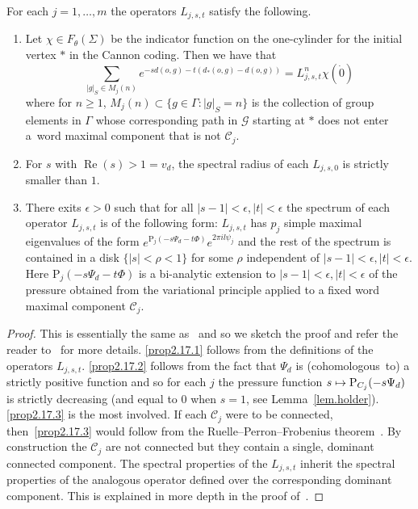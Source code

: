 \documentclass[AHL,Unicode,longabstracts,published]{cedram}
\newcommand{\G}{\Gamma}
\renewcommand{\SS}{\Sigma}
\newcommand{\p}{\psi}
\renewcommand{\P}{\Psi}
\newcommand{\Cc}{\mathcal{C}}
\newcommand{\Gc}{\mathcal{G}}
\DeclareMathOperator{\rRe}{Re}
\newcommand*\rmP{\mathrm{P}}
\let\oldmapsto\mapsto
\renewcommand*{\mapsto}{\mathchoice{\longmapsto}{\oldmapsto}{\oldmapsto}{\oldmapsto}}
\theoremstyle{plain}
\newcommand{\G}{\Gamma}
\begin{document}
\begin{prop}\label{prop.sr}
For each $j=1,\dots, m$ the operators $L_{j,s,t}$ satisfy the following.
\begin{enumerate}
\item\label{prop2.17.1} Let $\chi \in F_\theta(\SS)$ be the indicator function on the one-cylinder for the initial vertex $\ast$ in the Cannon coding. Then we have that
\[
\sum_{|g|_S \in M_j(n)} e^{-s d(o,g) - t(d_\ast(o,g) - d(o,g))} = L_{j,s,t}^n \chi(\dot{0})
\]
where for $n\ge 1$, $M_j(n) \subset \{g\in\G: |g|_S = n\}$ is the collection of group elements in $\G$ whose corresponding path in $\Gc$ starting at $\ast$ does not enter a~word maximal component that is not $\Cc_j$.
\item\label{prop2.17.2} For $s$ with $\rRe(s) > 1 = v_d$, the spectral radius of each $L_{j,s,0}$ is strictly smaller than $1$.
\item\label{prop2.17.3} There exits $\epsilon > 0$ such that for all $|s - 1| < \epsilon, |t| < \epsilon$ the spectrum of each operator $L_{j,s,t}$ is of the following form: $L_{j,s,t}$ has $p_j$ simple maximal eigenvalues of the form $e^{\rmP_j(-s\P_d - t\Phi)} e^{2\pi i l\p_j}$ and the rest of the spectrum is contained in a disk $\{|s| < \rho < 1\}$ for some $\rho$ independent of $|s-1|<\epsilon, |t| < \epsilon$. Here $\rmP_j(-s\P_d - t\Phi)$ is a bi-analytic extension to $|s-1|<\epsilon, |t| < \epsilon$ of the pressure obtained from the variational principle applied to a fixed word maximal component $\Cc_j$.
\end{enumerate}
\end{prop}
\begin{proof}
This is essentially the same as~\cite[Proposition~4.3]{cantrell} and so we sketch the proof and refer the reader to~\cite{cantrell} for more details. \eqref{prop2.17.1} follows from the definitions of the operators $L_{j,s,t}$. \eqref{prop2.17.2} follows from the fact that $\Psi_d$ is (cohomologous~to) a strictly positive function and so for each $j$ the pressure function $s \mapsto \rmP_{C_j}(-s\Psi_d)$ is strictly decreasing (and equal to $0$ when $s = 1$, see Lemma~\ref{lem.holder}). \eqref{prop2.17.3} is the most involved. If each $\Cc_j$ were to be connected, then~\eqref{prop2.17.3} would follow from the {Ruelle--Perron--Frobenius theorem}~\cite{ParryPollicott}. By construction the $\Cc_j$ are not connected but they contain a single, dominant connected component. The spectral properties of the $L_{j,s,t}$ inherit the spectral properties of the analogous operator defined over the corresponding dominant component. This is explained in more depth in the proof of~\cite[Proposition~4.3]{cantrell}.
\end{proof}
\end{document}
